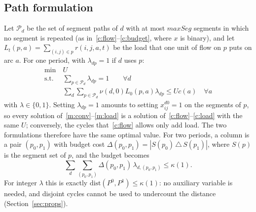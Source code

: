 \documentclass[conference]{IEEEtran}
\begin{document}
\subsection{Path formulation}
Let $\mathcal P_d$ be the set of segment paths of $d$ with at most $maxSeg$ segments in which no segment is repeated (as in~\eqref{c:flow}--\eqref{c:budget}, where $x$ is binary), and let $L_t(p,a)=\sum_{(i,j)\in p}r(i,j,a,t)$ be the load that one unit of flow on $p$ puts on arc $a$. For one period, with $\lambda_{dp}=1$ if $d$ uses $p$:
\begin{align}
\min\ & U\nonumber\\
\text{s.t. } & \textstyle\sum_{p\in\mathcal P_d}\lambda_{dp}=1 \qquad \forall d \label{m:conv}\\
& \textstyle\sum_d\sum_{p\in\mathcal P_d}\nu(d,0)L_0(p,a)\lambda_{dp}\le U c(a)\quad \forall a \label{m:load}
\end{align}
with $\lambda\in\{0,1\}$. Setting $\lambda_{dp}=1$ amounts to setting $x^{d0}_{ij}=1$ on the segments of $p$, so every solution of~\eqref{m:conv}--\eqref{m:load} is a solution of~\eqref{c:flow}--\eqref{c:load} with the same $U$; conversely, the cycles that~\eqref{c:flow} allows only add load. The two formulations therefore have the same optimal value. For two periods, a column is a pair $(p_0,p_1)$ with budget cost $\Delta(p_0,p_1)=|S(p_0)\,\triangle\,S(p_1)|$, where $S(p)$ is the segment set of $p$, and the budget becomes
\begin{equation}
\textstyle\sum_d\sum_{(p_0,p_1)}\Delta(p_0,p_1)\,\lambda_{d,(p_0,p_1)}\le\kappa(1).\label{m:budget}
\end{equation}
For integer $\lambda$ this is exactly $\mathrm{dist}(P^0,P^1)\le\kappa(1)$: no auxiliary variable is needed, and disjoint cycles cannot be used to undercount the distance (Section~\ref{sec:props}).
\end{document}
